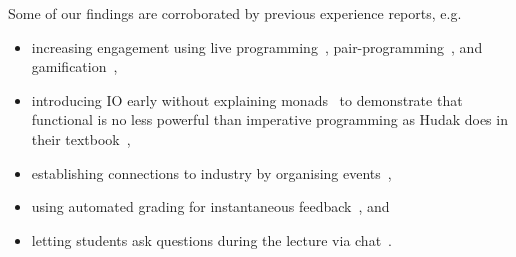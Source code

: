Some of our findings are corroborated by previous experience reports, e.g.
\begin{itemize}
  \item increasing engagement using live programming~\cite{fp_first_year_risks_benefits}, pair-programming~\cite{teaching_fp_first_year}, and gamification~\cite{soccerfun,teaching_fp_glossy_games,teaching_fp_macedonian},
  \item introducing IO early without explaining monads~\cite{fp_first_year_risks_benefits,teaching_fp_chalmers} to demonstrate that functional is no less powerful than imperative programming as Hudak does in their textbook~\cite{haskell_school_hudak},
  \item establishing connections to industry by organising events~\cite{teaching_fp_chalmers},
  \item using automated grading for instantaneous feedback~\cite{teaching_art_fp_automated,teaching_fp_macedonian,teaching_fp_glossy_games}, and
  \item letting students ask questions during the lecture via chat~\cite{increase_interest_fp}.
   
\end{itemize}

